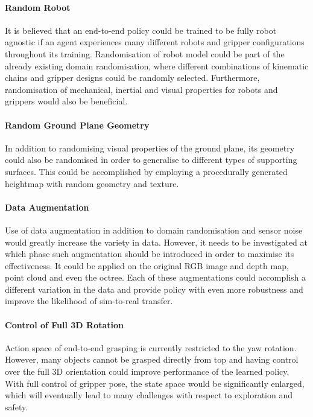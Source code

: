 \paragraph{Random Robot} It is believed that an end-to-end policy could be trained to be fully robot agnostic if an agent experiences many different robots and gripper configurations throughout its training. Randomisation of robot model could be part of the already existing domain randomisation, where different combinations of kinematic chains and gripper designs could be randomly selected. Furthermore, randomisation of mechanical, inertial and visual properties for robots and grippers would also be beneficial.

\paragraph{Random Ground Plane Geometry} In addition to randomising visual properties of the ground plane, its geometry could also be randomised in order to generalise to different types of supporting surfaces. This could be accomplished by employing a procedurally generated heightmap with random geometry and texture.

\paragraph{Data Augmentation} Use of data augmentation in addition to domain randomisation and sensor noise would greatly increase the variety in data. However, it needs to be investigated at which phase such augmentation should be introduced in order to maximise its effectiveness. It could be applied on the original RGB image and depth map, point cloud and even the octree. Each of these augmentations could accomplish a different variation in the data and provide policy with even more robustness and improve the likelihood of sim-to-real transfer.

\paragraph{Control of Full 3D Rotation} Action space of end-to-end grasping is currently restricted to the yaw rotation. However, many objects cannot be grasped directly from top and having control over the full 3D orientation could improve performance of the learned policy. With full control of gripper pose, the state space would be significantly enlarged, which will eventually lead to many challenges with respect to exploration and safety.


